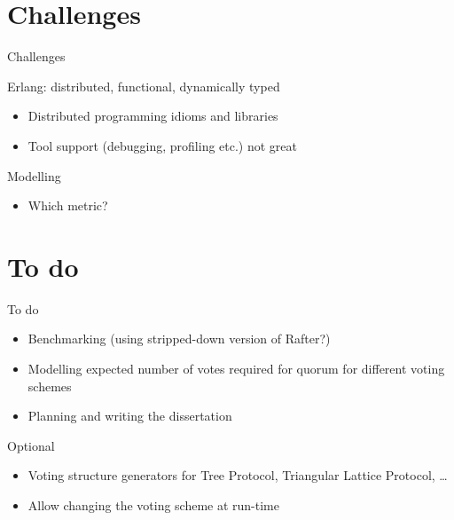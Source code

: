 \documentclass{beamer}
\begin{document}
\section{Challenges}
\begin{frame}{Challenges}
    \begin{block}{Erlang: distributed, functional, dynamically typed}
        \begin{itemize}
            \item Distributed programming idioms and libraries
            \item Tool support (debugging, profiling etc.) not great
        \end{itemize}
    \end{block}
    \begin{block}{Modelling}
        \begin{itemize}
            \item Which metric?
        \end{itemize}
    \end{block}
\end{frame}

\section{To do}
\begin{frame}{To do}
    \begin{itemize}
        \item Benchmarking (using stripped-down version of Rafter?)
        \item Modelling expected number of votes required for quorum for different voting schemes
        \item Planning and writing the dissertation
    \end{itemize}
    \begin{block}{Optional}
        \begin{itemize}
            \item Voting structure generators for Tree Protocol, Triangular Lattice Protocol, \ldots
            \item Allow changing the voting scheme at run-time %
        \end{itemize}
    \end{block}
\end{frame}
\end{document}
